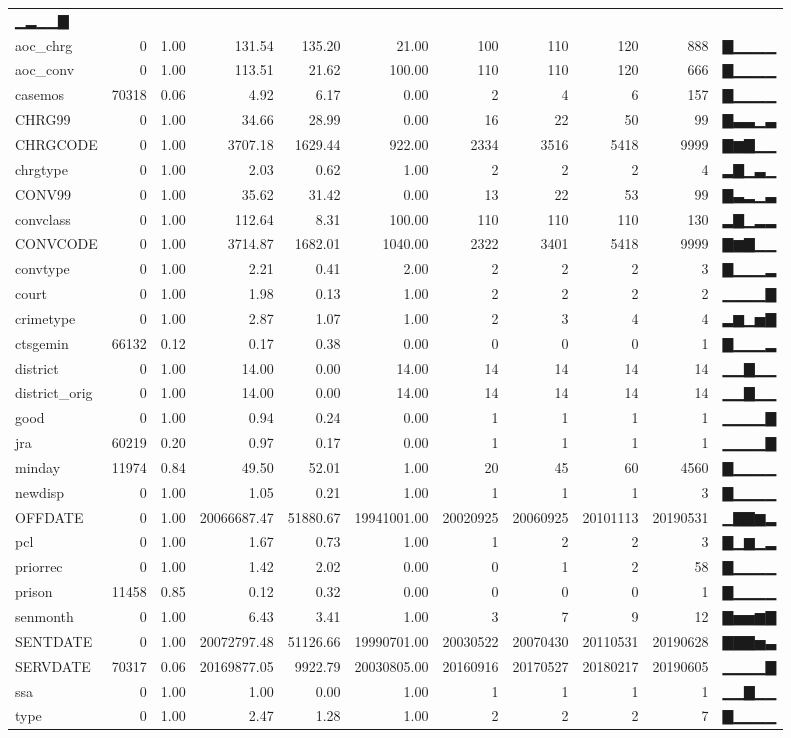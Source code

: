 \documentclass[
]{article}
\begin{document}
\begin{longtable}[]{@{}lrrrrrrrrrl@{}}
▁▂▁▁▇\tabularnewline
aoc\_chrg & 0 & 1.00 & 131.54 & 135.20 & 21.00 & 100 & 110 & 120 & 888 &
▇▁▁▁▁\tabularnewline
aoc\_conv & 0 & 1.00 & 113.51 & 21.62 & 100.00 & 110 & 110 & 120 & 666 &
▇▁▁▁▁\tabularnewline
casemos & 70318 & 0.06 & 4.92 & 6.17 & 0.00 & 2 & 4 & 6 & 157 &
▇▁▁▁▁\tabularnewline
CHRG99 & 0 & 1.00 & 34.66 & 28.99 & 0.00 & 16 & 22 & 50 & 99 &
▇▃▃▁▃\tabularnewline
CHRGCODE & 0 & 1.00 & 3707.18 & 1629.44 & 922.00 & 2334 & 3516 & 5418 &
9999 & ▇▆▇▁▁\tabularnewline
chrgtype & 0 & 1.00 & 2.03 & 0.62 & 1.00 & 2 & 2 & 2 & 4 &
▂▇▁▃▁\tabularnewline
CONV99 & 0 & 1.00 & 35.62 & 31.42 & 0.00 & 13 & 22 & 53 & 99 &
▇▃▂▁▃\tabularnewline
convclass & 0 & 1.00 & 112.64 & 8.31 & 100.00 & 110 & 110 & 110 & 130 &
▂▇▁▂▂\tabularnewline
CONVCODE & 0 & 1.00 & 3714.87 & 1682.01 & 1040.00 & 2322 & 3401 & 5418 &
9999 & ▇▆▇▁▁\tabularnewline
convtype & 0 & 1.00 & 2.21 & 0.41 & 2.00 & 2 & 2 & 2 & 3 &
▇▁▁▁▂\tabularnewline
court & 0 & 1.00 & 1.98 & 0.13 & 1.00 & 2 & 2 & 2 & 2 &
▁▁▁▁▇\tabularnewline
crimetype & 0 & 1.00 & 2.87 & 1.07 & 1.00 & 2 & 3 & 4 & 4 &
▂▆▁▅▇\tabularnewline
ctsgemin & 66132 & 0.12 & 0.17 & 0.38 & 0.00 & 0 & 0 & 0 & 1 &
▇▁▁▁▂\tabularnewline
district & 0 & 1.00 & 14.00 & 0.00 & 14.00 & 14 & 14 & 14 & 14 &
▁▁▇▁▁\tabularnewline
district\_orig & 0 & 1.00 & 14.00 & 0.00 & 14.00 & 14 & 14 & 14 & 14 &
▁▁▇▁▁\tabularnewline
good & 0 & 1.00 & 0.94 & 0.24 & 0.00 & 1 & 1 & 1 & 1 &
▁▁▁▁▇\tabularnewline
jra & 60219 & 0.20 & 0.97 & 0.17 & 0.00 & 1 & 1 & 1 & 1 &
▁▁▁▁▇\tabularnewline
minday & 11974 & 0.84 & 49.50 & 52.01 & 1.00 & 20 & 45 & 60 & 4560 &
▇▁▁▁▁\tabularnewline
newdisp & 0 & 1.00 & 1.05 & 0.21 & 1.00 & 1 & 1 & 1 & 3 &
▇▁▁▁▁\tabularnewline
OFFDATE & 0 & 1.00 & 20066687.47 & 51880.67 & 19941001.00 & 20020925 &
20060925 & 20101113 & 20190531 & ▁▇▇▆▂\tabularnewline
pcl & 0 & 1.00 & 1.67 & 0.73 & 1.00 & 1 & 2 & 2 & 3 &
▇▁▆▁▂\tabularnewline
priorrec & 0 & 1.00 & 1.42 & 2.02 & 0.00 & 0 & 1 & 2 & 58 &
▇▁▁▁▁\tabularnewline
prison & 11458 & 0.85 & 0.12 & 0.32 & 0.00 & 0 & 0 & 0 & 1 &
▇▁▁▁▁\tabularnewline
senmonth & 0 & 1.00 & 6.43 & 3.41 & 1.00 & 3 & 7 & 9 & 12 &
▇▅▅▆▇\tabularnewline
SENTDATE & 0 & 1.00 & 20072797.48 & 51126.66 & 19990701.00 & 20030522 &
20070430 & 20110531 & 20190628 & ▇▇▇▅▃\tabularnewline
SERVDATE & 70317 & 0.06 & 20169877.05 & 9922.79 & 20030805.00 & 20160916
& 20170527 & 20180217 & 20190605 & ▁▁▁▁▇\tabularnewline
ssa & 0 & 1.00 & 1.00 & 0.00 & 1.00 & 1 & 1 & 1 & 1 &
▁▁▇▁▁\tabularnewline
type & 0 & 1.00 & 2.47 & 1.28 & 1.00 & 2 & 2 & 2 & 7 &
▇▁▁▁▁\tabularnewline
\bottomrule
\end{longtable}
\end{document}
